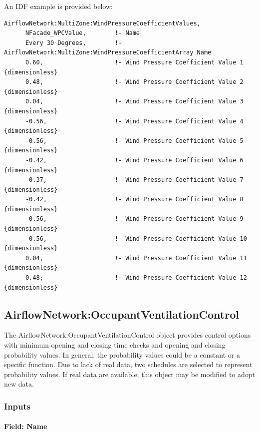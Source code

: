 An IDF example is provided below:

\begin{lstlisting}
AirflowNetwork:MultiZone:WindPressureCoefficientValues,
      NFacade_WPCValue,        !- Name
      Every 30 Degrees,        !- AirflowNetwork:MultiZone:WindPressureCoefficientArray Name
      0.60,                    !- Wind Pressure Coefficient Value 1 {dimensionless}
      0.48,                    !- Wind Pressure Coefficient Value 2 {dimensionless}
      0.04,                    !- Wind Pressure Coefficient Value 3 {dimensionless}
      -0.56,                   !- Wind Pressure Coefficient Value 4 {dimensionless}
      -0.56,                   !- Wind Pressure Coefficient Value 5 {dimensionless}
      -0.42,                   !- Wind Pressure Coefficient Value 6 {dimensionless}
      -0.37,                   !- Wind Pressure Coefficient Value 7 {dimensionless}
      -0.42,                   !- Wind Pressure Coefficient Value 8 {dimensionless}
      -0.56,                   !- Wind Pressure Coefficient Value 9 {dimensionless}
      -0.56,                   !- Wind Pressure Coefficient Value 10 {dimensionless}
      0.04,                    !- Wind Pressure Coefficient Value 11 {dimensionless}
      0.48;                    !- Wind Pressure Coefficient Value 12 {dimensionless}
\end{lstlisting}

\subsection{AirflowNetwork:OccupantVentilationControl}\label{airflownetworkoccupantventilationcontrol}

The AirflowNetwork:OccupantVentilationControl object provides control options with minimum opening and closing time checks and opening and closing probability values. In general, the probability values could be a constant or a specific function. Due to lack of real data, two schedules are selected to represent probability values. If real data are available, this object may be modified to adopt new data.

\subsubsection{Inputs}\label{inputs-11-001}

\paragraph{Field: Name}\label{field-name-11-001}

